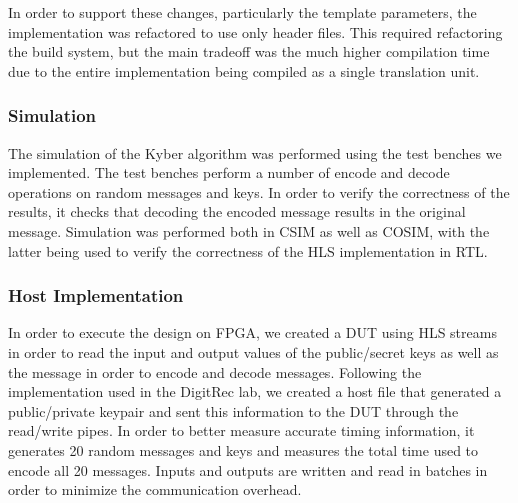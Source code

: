 In order to support these changes, particularly the template parameters, the implementation was refactored to use only header files. This required refactoring the build system, but the main tradeoff was the much higher compilation time due to the entire implementation being compiled as a single translation unit.


\subsubsection*{Simulation}
The simulation of the Kyber algorithm was performed using the test benches we implemented. The test benches perform a number of encode and decode operations on random messages and keys. In order to verify the correctness of the results, it checks that decoding the encoded message results in the original message. Simulation was performed both in CSIM as well as COSIM, with the latter being used to verify the correctness of the HLS implementation in RTL.


\subsubsection*{Host Implementation}

In order to execute the design on FPGA, we created a DUT using HLS streams in order to read the input and output values of the public/secret keys as well as the message in order to encode and decode messages. Following the implementation used in the DigitRec lab, we created a host file that generated a public/private keypair and sent this information to the DUT through the read/write pipes. In order to better measure accurate timing information, it generates 20 random messages and keys and measures the total time used to encode all 20 messages. Inputs and outputs are written and read in batches in order to minimize the communication overhead.